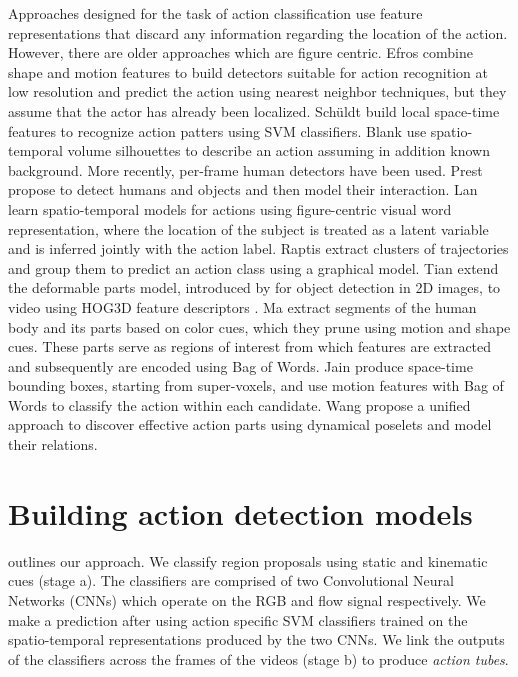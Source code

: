 \documentclass[10pt,twocolumn,letterpaper]{article}
\begin{document}
Approaches designed for the task of action classification use feature representations that discard any information regarding the location of the action. However, there are older approaches which are figure centric. Efros \etal \cite{30pixman} combine shape and motion features to build detectors suitable for action recognition at low resolution and predict the action using nearest neighbor techniques, but they assume that the actor has already been localized. Sch\"{u}ldt \etal \cite{Laptev2004} build local space-time features to recognize action patters using SVM classifiers. Blank \etal \cite{Irani2005} use spatio-temporal volume silhouettes to describe an action assuming in addition known background. More recently, per-frame human detectors have been used. Prest \etal \cite{prest:hal-00720847} propose to detect humans and objects and then model their interaction. Lan \etal \cite{LanWM11} learn spatio-temporal models for actions using figure-centric visual word representation, where the location of the subject is treated as a latent variable and is inferred jointly with the action label. Raptis \etal \cite{RaptisKS12} extract clusters of trajectories and group them to predict an action class using a graphical model. Tian \etal \cite{SDPM} extend the deformable parts model, introduced by \cite{lsvm-pami} for object detection in 2D images, to video using HOG3D feature descriptors \cite{klaser:inria-00514845}. Ma \etal extract segments of the human body and its parts based on color cues, which they prune using motion and shape cues. These parts serve as regions of interest from which features are extracted and subsequently are encoded using Bag of Words. Jain \etal \cite{Jain2014} produce space-time bounding boxes, starting from super-voxels, and use motion features with Bag of Words to classify the action within each candidate. Wang \etal \cite{WangQT14} propose a unified approach to discover effective action parts using dynamical poselets and model their relations. 

 \section{Building action detection models}

 outlines our approach. We classify region proposals using static and kinematic cues (stage a). The classifiers are comprised of two Convolutional Neural Networks (CNNs) which operate on the RGB and flow signal respectively. We make a prediction after using action specific SVM classifiers trained on the spatio-temporal representations produced by the two CNNs. We link the outputs of the classifiers across the frames of the videos (stage b) to produce \textit{action tubes}. 
\end{document}
